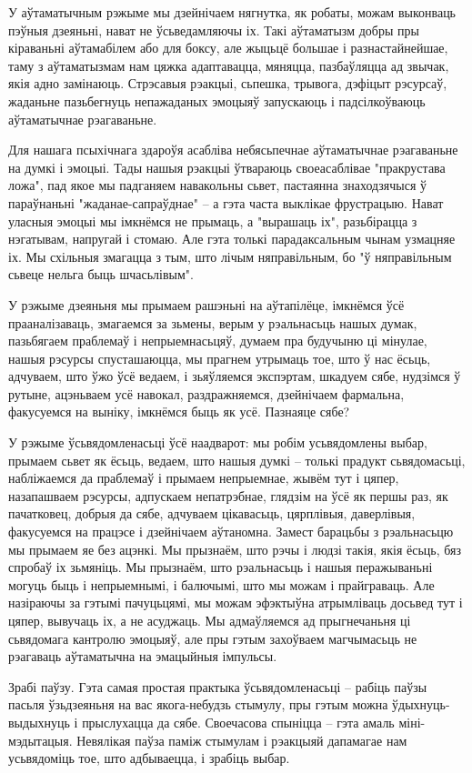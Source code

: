 У аўтаматычным рэжыме мы дзейнічаем нягнутка, як робаты, можам выконваць пэўныя дзеяньні, нават не ўсьведамляючы іх. Такі аўтаматызм добры пры кіраваньні аўтамабілем або для боксу, але жыцьцё большае і разнастайнейшае, таму з аўтаматызмам нам цяжка адаптавацца, мяняцца, пазбаўляцца ад звычак, якія адно замінаюць. Стрэсавыя рэакцыі, сьпешка, трывога, дэфіцыт рэсурсаў, жаданьне пазьбегнуць непажаданых эмоцыяў запускаюць і падсілкоўваюць аўтаматычнае рэагаваньне.

Для нашага псыхічнага здароўя асабліва небясьпечнае аўтаматычнае рэагаваньне на думкі і эмоцыі. Тады нашыя рэакцыі ўтвараюць своеасаблівае "пракрустава ложа", пад якое мы падганяем навакольны сьвет, пастаянна знаходзячыся ў параўнаньні "жаданае-сапраўднае" – а гэта часта выклікае фрустрацыю. Нават уласныя эмоцыі мы імкнёмся не прымаць, а "вырашаць іх", разьбірацца з нэгатывам, напругай і стомаю. Але гэта толькі парадаксальным чынам узмацняе іх. Мы схільныя змагацца з тым, што лічым няправільным, бо "ў няправільным сьвеце нельга быць шчасьлівым".

У рэжыме дзеяньня мы прымаем рашэньні на аўтапілёце, імкнёмся ўсё прааналізаваць, змагаемся за зьмены, верым у рэальнасьць нашых думак, пазьбягаем праблемаў і непрыемнасьцяў, думаем пра будучыню ці мінулае, нашыя рэсурсы спусташаюцца, мы прагнем утрымаць тое, што ў нас ёсьць, адчуваем, што ўжо ўсё ведаем, і зьяўляемся экспэртам, шкадуем сябе, нудзімся ў рутыне, ацэньваем усё навокал, раздражняемся, дзейнічаем фармальна, факусуемся на выніку, імкнёмся быць як усё. Пазнаяце сябе?

У рэжыме ўсьвядомленасьці ўсё наадварот: мы робім усьвядомлены выбар, прымаем сьвет як ёсьць, ведаем, што нашыя думкі – толькі прадукт сьвядомасьці, набліжаемся да праблемаў і прымаем непрыемнае, жывём тут і цяпер, назапашваем рэсурсы, адпускаем непатрэбнае, глядзім на ўсё як першы раз, як пачатковец, добрыя да сябе, адчуваем цікавасьць, цярплівыя, даверлівыя, факусуемся на працэсе і дзейнічаем аўтаномна. Замест барацьбы з рэальнасьцю мы прымаем яе без ацэнкі. Мы прызнаём, што рэчы і людзі такія, якія ёсьць, бяз спробаў іх зьмяніць. Мы прызнаём, што рэальнасьць і нашыя перажываньні могуць быць і непрыемнымі, і балючымі, што мы можам і прайграваць. Але назіраючы за гэтымі пачуцьцямі, мы можам эфэктыўна атрымліваць досьвед тут і цяпер, вывучаць іх, а не асуджаць. Мы адмаўляемся ад прыгнечаньня ці сьвядомага кантролю эмоцыяў, але пры гэтым захоўваем магчымасьць не рэагаваць аўтаматычна на эмацыйныя імпульсы.

Зрабі паўзу. Гэта самая простая практыка ўсьвядомленасьці – рабіць паўзы пасьля ўзьдзеяньня на вас якога-небудзь стымулу, пры гэтым можна ўдыхнуць-выдыхнуць і прыслухацца да сябе. Своечасова спыніцца – гэта амаль міні-мэдытацыя. Невялікая паўза паміж стымулам і рэакцыяй дапамагае нам усьвядоміць тое, што адбываецца, і зрабіць выбар.

